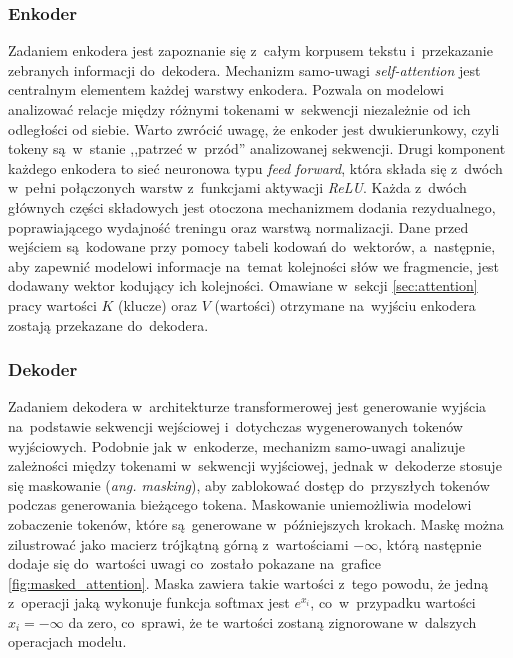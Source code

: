 \documentclass[data-science]{agh-wi} %
\begin{document}
\subsubsection*{Enkoder}
Zadaniem enkodera jest zapoznanie się z~całym korpusem tekstu i~przekazanie zebranych informacji do~dekodera. Mechanizm samo-uwagi \textit{self-attention} jest centralnym elementem każdej warstwy enkodera. Pozwala on modelowi analizować relacje między różnymi tokenami w~sekwencji niezależnie od ich odległości od siebie. Warto zwrócić uwagę, że enkoder jest dwukierunkowy, czyli tokeny są~w~stanie ,,patrzeć w~przód'' analizowanej sekwencji. Drugi komponent każdego enkodera to sieć neuronowa typu \textit{feed forward}, która składa się z~dwóch w~pełni połączonych warstw z~funkcjami aktywacji \textit{ReLU}. Każda z~dwóch głównych części składowych jest otoczona mechanizmem dodania rezydualnego, poprawiającego wydajność treningu oraz warstwą normalizacji. Dane przed wejściem są~kodowane przy pomocy tabeli kodowań do~wektorów, a~następnie, aby zapewnić modelowi informacje na~temat kolejności słów we fragmencie, jest dodawany wektor kodujący ich kolejności. Omawiane w~sekcji \ref*{sec:attention} pracy wartości $K$ (klucze) oraz $V$ (wartości) otrzymane na~wyjściu enkodera zostają przekazane do~dekodera.

\subsubsection*{Dekoder}
Zadaniem dekodera w~architekturze transformerowej jest generowanie wyjścia na~podstawie sekwencji wejściowej i~dotychczas wygenerowanych tokenów wyjściowych. Podobnie jak w~enkoderze, mechanizm samo-uwagi analizuje zależności między tokenami w~sekwencji wyjściowej, jednak w~dekoderze stosuje się maskowanie (\textit{ang. masking}), aby zablokować dostęp do~przyszłych tokenów podczas generowania bieżącego tokena. Maskowanie uniemożliwia modelowi zobaczenie tokenów, które są~generowane w~późniejszych krokach. Maskę można zilustrować jako macierz trójkątną górną z~wartościami $-\infty$, którą następnie dodaje się do~wartości uwagi co~zostało pokazane na~grafice \ref*{fig:masked_attention}. Maska zawiera takie wartości z~tego powodu, że jedną z~operacji jaką wykonuje funkcja softmax jest $e^{x_i}$, co~w~przypadku wartości $x_i = -\infty$ da zero, co~sprawi, że te wartości zostaną zignorowane w~dalszych operacjach modelu.
\end{document}
